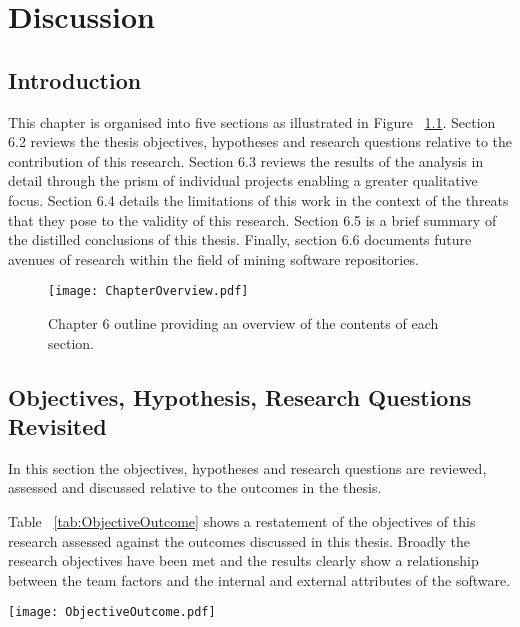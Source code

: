 
\graphicspath{{Chapter6/Figures/}{Chapter6/Tables/}{Chapter6/Charts/}}

\chapter{Discussion}
\section{Introduction} %
This chapter is organised into five sections as illustrated in Figure ~\ref{fig:chapter6overview}. Section 6.2 reviews the thesis objectives, hypotheses and research questions relative to the contribution of this research. Section 6.3 reviews the results of the analysis in detail through the prism of individual projects enabling a greater qualitative focus. Section 6.4 details the limitations of this work in the context of the threats that they pose to the validity of this research. Section 6.5 is a brief summary of the distilled conclusions of this thesis. Finally, section 6.6 documents future avenues of research within the field of mining software repositories.

\begin{landscape}
\begin{figure}[htbp!] 
\centering    
\texttt{[image: ChapterOverview.pdf]}
\caption{Chapter 6 outline providing an overview of the contents of each section.}
\label{fig:chapter6overview}
\end{figure}
\end{landscape}

\section{Objectives, Hypothesis, Research Questions Revisited} %
In this section the objectives, hypotheses and research questions are reviewed, assessed and discussed relative
to the outcomes in the thesis.

Table ~\ref{tab:ObjectiveOutcome} shows a restatement of the objectives of this research assessed against the outcomes discussed in this thesis. Broadly the research objectives have been met and the results clearly show a relationship between the team factors and the internal and external attributes of the software. 

\begin{table}
\begin{tabular}
 \centering 
 \texttt{[image: ObjectiveOutcome.pdf]}
 \label{tab:ObjectiveOutcome}
\end{tabular}
\end{table}

